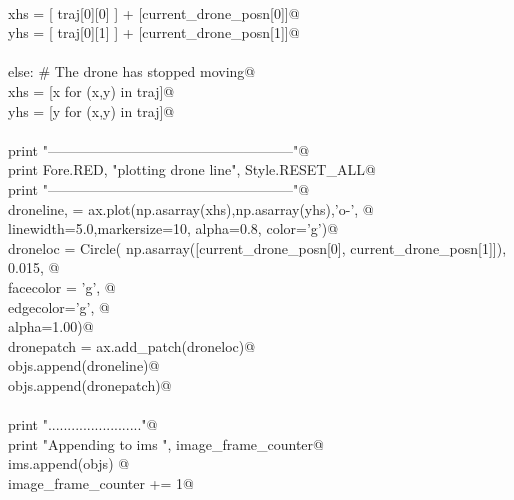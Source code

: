 \documentclass[10.0pt]{report}
\begin{document}
\begin{appendices}
\begin{flushleft}
\begin{list}{}{}
\mbox{}\verb@@\\
\mbox{}\verb@                  xhs = [ traj[0][0] ] + [current_drone_posn[0]]@\\
\mbox{}\verb@                  yhs = [ traj[0][1] ] + [current_drone_posn[1]]@\\
\mbox{}\verb@@\\
\mbox{}\verb@            else: # The drone has stopped moving@\\
\mbox{}\verb@                  xhs = [x for (x,y) in traj]@\\
\mbox{}\verb@                  yhs = [y for (x,y) in traj]@\\
\mbox{}\verb@@\\
\mbox{}\verb@            print "-----------------------------------------------------"@\\
\mbox{}\verb@            print Fore.RED, "plotting drone line", Style.RESET_ALL@\\
\mbox{}\verb@            print "-----------------------------------------------------"@\\
\mbox{}\verb@            droneline, = ax.plot(np.asarray(xhs),np.asarray(yhs),'o-', @\\
\mbox{}\verb@                                   linewidth=5.0,markersize=10, alpha=0.8, color='g')@\\
\mbox{}\verb@            droneloc   = Circle( np.asarray([current_drone_posn[0], current_drone_posn[1]]), 0.015, @\\
\mbox{}\verb@                                    facecolor = 'g', @\\
\mbox{}\verb@                                    edgecolor='g',  @\\
\mbox{}\verb@                                    alpha=1.00)@\\
\mbox{}\verb@            dronepatch = ax.add_patch(droneloc)@\\
\mbox{}\verb@            objs.append(droneline)@\\
\mbox{}\verb@            objs.append(dronepatch)@\\
\mbox{}\verb@@\\
\mbox{}\verb@        print "........................"@\\
\mbox{}\verb@        print "Appending to ims ", image_frame_counter@\\
\mbox{}\verb@        ims.append(objs) @\\
\mbox{}\verb@        image_frame_counter += 1@\\
\mbox{}\verb@@\\

\end{list}
\end{flushleft}
\end{appendices}
\end{document}
